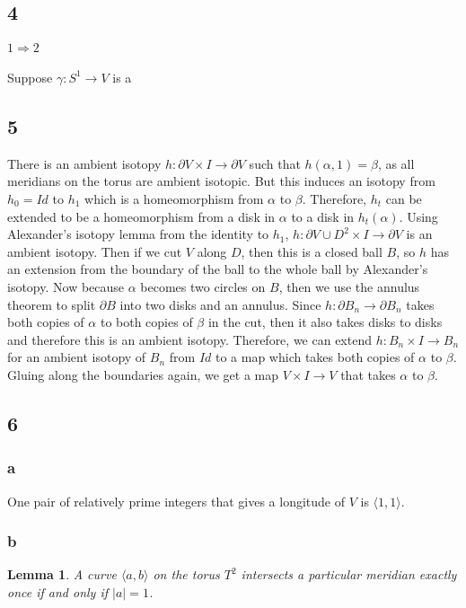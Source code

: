 \documentclass{article}
\newtheorem{lemma}[theorem]{Lemma}
\theoremstyle{definition}
\numberwithin{theorem}{section}
\numberwithin{equation}{section}
\begin{document}
\subsection{4}
\paragraph{$1 \Rightarrow 2$} Suppose $\gamma : S^1 \rightarrow V$ is a 

\subsection{5}

There is an ambient isotopy $h : \partial V \times I \rightarrow \partial V$ such that $h(\alpha, 1) = \beta$, as all meridians on the torus are ambient isotopic. But this induces an isotopy from $h_0 = Id$ to $h_1$ which is a homeomorphism from $\alpha$ to $\beta$. Therefore, $h_t$ can be extended to be a homeomorphism from a disk in $\alpha$ to a disk in $h_t(\alpha)$. Using Alexander's isotopy lemma from the identity to $h_1$, $h : \partial V \cup D^2 \times I \rightarrow \partial V$ is an ambient isotopy. Then if we cut $V$ along $D$, then this is a closed ball $B$, so $h$ has an extension from the boundary of the ball to the whole ball by Alexander's isotopy. Now because $\alpha$ becomes two circles on $B$, then we use the annulus theorem to split $\partial B$ into two disks and an annulus. Since $h: \partial B_n \rightarrow \partial B_n$ takes both copies of $\alpha$ to both copies of $\beta$ in the cut, then it also takes disks to disks and therefore this is an ambient isotopy. Therefore, we can extend $h : B_n \times I \rightarrow B_n$ for an ambient isotopy of $B_n$ from $Id$ to a map which takes both copies of $\alpha$ to $\beta$. Gluing along the boundaries again, we get a map $V \times I \rightarrow V$ that takes $\alpha $ to $\beta$. 

\subsection{6}
\subsubsection{a}
One pair of relatively prime integers that gives a longitude of $V$ is $\langle 1, 1\rangle$. 
\subsubsection{b}
\begin{lemma}
    A curve $\langle a, b \rangle$ on the torus $T^2$ intersects a particular meridian exactly once if and only if $|a| = 1$. 
\end{lemma}
\end{document}
